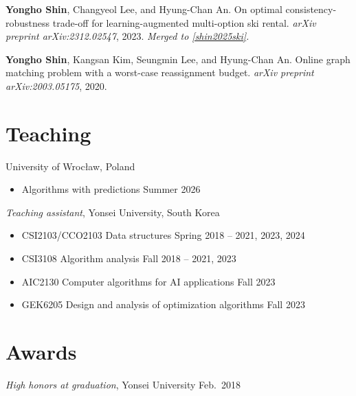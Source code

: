 \documentclass{article}
\newcommand{\killinitspace}{-0.7em}
\begin{document}
\begin{enumerate}[label={[\arabic*]}]
	\item \label{shin2023ski2} \textbf{Yongho Shin}, Changyeol Lee, and Hyung-Chan An. On optimal consistency-robustness trade-off for learning-augmented multi-option ski rental. \emph{arXiv preprint arXiv:2312.02547}, 2023. \emph{Merged to \ref{shin2025ski}.}
		
	\item \label{shin2020matching} \textbf{Yongho Shin}, Kangsan Kim, Seungmin Lee, and Hyung-Chan An. Online graph matching problem with a worst-case reassignment budget. \emph{arXiv preprint arXiv:2003.05175}, 2020.
\end{enumerate}

\section{Teaching}
University of Wrocław, Poland
\vspace{\killinitspace}
\begin{itemize}
\item Algorithms with predictions \hfill Summer 2026
\end{itemize}

\textsl{Teaching assistant}, Yonsei University, South Korea
\vspace{\killinitspace}
\begin{itemize}
\item CSI2103/CCO2103 Data structures \hfill Spring 2018 -- 2021, 2023, 2024
\item CSI3108 Algorithm analysis \hfill Fall 2018 -- 2021, 2023
\item AIC2130 Computer algorithms for AI applications \hfill Fall 2023
\item GEK6205 Design and analysis of optimization algorithms \hfill Fall 2023
\end{itemize}

\section{Awards}
\textsl{High honors at graduation}, Yonsei University \hfill Feb.~2018
\end{document}

